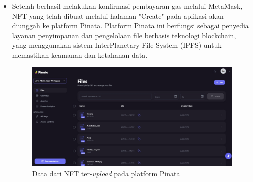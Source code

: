 \begin{itemize}
        \item Setelah berhasil melakukan konfirmasi pembayaran gas melalui MetaMask, NFT yang telah dibuat melalui halaman "Create" pada aplikasi akan diunggah ke platform Pinata. Platform Pinata ini berfungsi sebagai penyedia layanan penyimpanan dan pengelolaan file berbasis teknologi blockchain, yang menggunakan sistem InterPlanetary File System (IPFS) untuk memastikan keamanan dan ketahanan data.
        
        \begin{figure} [H] \centering
          \includegraphics[scale=0.25]{gambar/pinata.jpeg}
          \caption{Data dari NFT ter-\emph{upload} pada platform Pinata}
          \label{fig:pinata}
          \end{figure}


\end{itemize}
